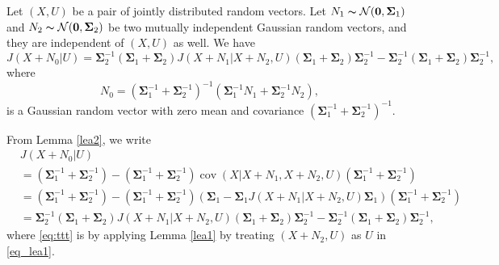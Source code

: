 \documentclass[journal,final, onecolumn]{IEEEtran}
\DeclareMathOperator{\cov}{cov}
\begin{document}
\begin{corollary}\label{comp}
Let $(X, U)$ be a pair of jointly distributed random vectors. Let $N_{1} \thicksim \mathcal{N}(\boldsymbol{0}, \boldsymbol{\Sigma}_{1})$ and $N_{2} \thicksim \mathcal{N}(\boldsymbol{0}, \boldsymbol{\Sigma}_{2})$ be two mutually independent Gaussian random vectors, and they are independent of $(X,U)$ as well. We have
\begin{equation}\label{eq_lee3}
J(X+N_{0}|U)= \boldsymbol{\Sigma}_2^{-1} \left(\boldsymbol{\Sigma}_1+\boldsymbol{\Sigma}_2 \right) J(X+N_1 | X+N_2, U) \left(\boldsymbol{\Sigma}_1+\boldsymbol{\Sigma}_2 \right)\boldsymbol{\Sigma}_2^{-1}-\boldsymbol{\Sigma}_2^{-1} \left(\boldsymbol{\Sigma}_1+\boldsymbol{\Sigma}_2 \right)\boldsymbol{\Sigma}_2^{-1},
\end{equation}
where
\begin{equation}
N_{0}= \left( \boldsymbol{\Sigma}_{1}^{-1} + \boldsymbol{\Sigma}_{2}^{-1}\right)^{-1} \left(  \boldsymbol{\Sigma}_{1}^{-1} N_{1} +    \boldsymbol{\Sigma}_{2}^{-1} N_{2} \right),
\end{equation}
is a Gaussian random vector with zero mean and covariance $\left( \boldsymbol{\Sigma}_{1}^{-1} + \boldsymbol{\Sigma}_{2}^{-1}\right)^{-1}$.
\end{corollary}
\begin{IEEEproof}
From Lemma \ref{lea2}, we write
\begin{align}
&J(X+N_{0}|U)\nonumber \\
&=\left( \boldsymbol{\Sigma}_{1}^{-1} +  \boldsymbol{\Sigma}_{2}^{-1} \right) - \left( \boldsymbol{\Sigma}_{1}^{-1} +  \boldsymbol{\Sigma}_{2}^{-1} \right) \cov(X|X+N_{1},X+N_{2},U) \left( \boldsymbol{\Sigma}_{1}^{-1} +  \boldsymbol{\Sigma}_{2}^{-1} \right)\\
&=\left( \boldsymbol{\Sigma}_{1}^{-1} +  \boldsymbol{\Sigma}_{2}^{-1} \right) -\left( \boldsymbol{\Sigma}_{1}^{-1} +  \boldsymbol{\Sigma}_{2}^{-1} \right)\left( \boldsymbol{\Sigma}_{1} -\boldsymbol{\Sigma}_{1} J(X+N_1 | X+N_{2}, U) \boldsymbol{\Sigma}_{1}\right)\left( \boldsymbol{\Sigma}_{1}^{-1} +  \boldsymbol{\Sigma}_{2}^{-1} \right)\label{eq:ttt}\\
&=\boldsymbol{\Sigma}_2^{-1} \left(\boldsymbol{\Sigma}_1+\boldsymbol{\Sigma}_2 \right) J(X+N_1 | X+N_2, U) \left(\boldsymbol{\Sigma}_1+\boldsymbol{\Sigma}_2 \right)\boldsymbol{\Sigma}_2^{-1}-\boldsymbol{\Sigma}_2^{-1} \left(\boldsymbol{\Sigma}_1+\boldsymbol{\Sigma}_2 \right)\boldsymbol{\Sigma}_2^{-1},
\end{align}
where \eqref{eq:ttt} is by applying Lemma \ref{lea1} by treating $(X+N_{2}, U)$ as $U$ in \eqref{eq_lea1}.
\end{IEEEproof}
\end{document}
